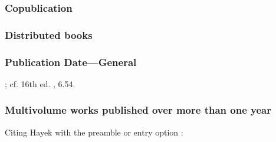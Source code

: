 \documentclass[11pt,letterpaper,oneside]{article}
\begin{document}
\setcounter{subsubsection}{139}
\subsubsection{Copublication}

\begin{citebib}
\item \cite{strauss1962}
\end{citebib}

\subsubsection{Distributed books}

\begin{citebib}
\item \cite{willke2007}
\end{citebib}

\subsubsection{Publication Date---General}
\label{14.142}

\begin{citebib}
\item \cite*[6.56]{chicago2017}; cf. 16th ed. \parencite*{chicago2010}, 6.54.
\item \cite{turabian2013}
\end{citebib}

\setcounter{subsubsection}{143}
\subsubsection{Multivolume works published over more than one year}
\label{14.144}

\begin{citebib}
\item \cite[329]{hayek2011}
\item \cite{tillich1951}
\end{citebib}

\noindent Citing Hayek with the preamble or entry option
:

\begin{citebib}
\item \cite*[329]{hayek2011}
\end{citebib}
\end{document}
